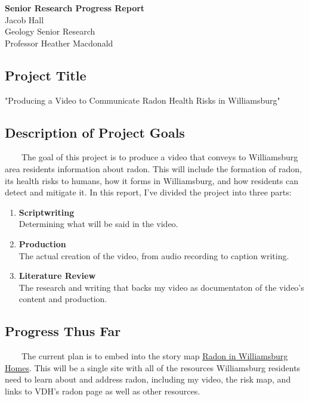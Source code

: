 \documentclass[
]{article}
\author{}
\date{}
\begin{document}
\textbf{Senior Research Progress Report}\\
Jacob Hall\\
Geology Senior Research\\
Professor Heather Macdonald

\subsection{Project Title}

"Producing a Video to Communicate Radon Health Risks in Williamsburg"

\subsection{Description of Project Goals}

~~~~The goal of this project is to produce a video that conveys to
Williamsburg area residents information about radon. This will include
the formation of radon, its health risks to humans, how it forms in
Williamsburg, and how residents can detect and mitigate it. In this
report, I've divided the project into three parts:

\begin{enumerate}
\def\labelenumi{\arabic{enumi}.}
\item
  \textbf{Scriptwriting}\\Determining what will be said in the video.
\item
  \textbf{Production}\\The actual creation of the video, from audio
  recording to caption writing.
\item
  \textbf{Literature Review}\\The research and writing that backs my
  video as documentaton of the video's content and production.
\end{enumerate}

\subsection{Progress Thus Far}

~~~~The current plan is to embed into the story map
\href{https://storymaps.arcgis.com/stories/10f6d3d7c0014a1087fe3ef14f306520}{Radon
in Williamsburg Homes}. This will be a single site with all of the
resources Williamsburg residents need to learn about and address radon,
including my video, the risk map, and links to VDH's radon page as well
as other resources.
\end{document}
